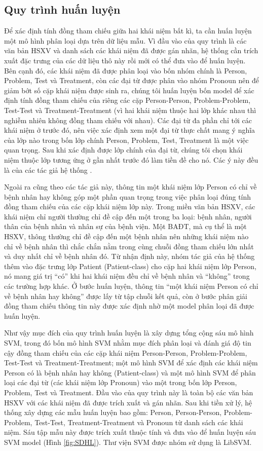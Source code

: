 \subsection*{Quy trình huấn luyện}
Để xác định tính đồng tham chiếu giữa hai khái niệm bất kì, ta cần huấn luyện một mô hình phân loại dựa trên dữ liệu mẫu. Vì đầu vào của quy trình là các văn bản HSXV và danh sách các khái niệm đã được gán nhãn, hệ thống cần trích xuất đặc trưng của các dữ liệu thô này rồi mới có thể đưa vào để huấn luyện. Bên cạnh đó, các khái niệm đã được phân loại vào bốn nhóm chính là Person, Problem, Test và Treatment, còn các đại từ được phân vào nhóm Pronoun nên để giảm bớt số cặp khái niệm được sinh ra, chúng tôi huấn luyện bốn model để xác định tính đồng tham chiếu của riêng các cặp Person-Person, Problem-Problem, Test-Test và Treatment-Treatment (vì hai khái niệm thuộc hai lớp khác nhau thì nghiễm nhiên không đồng tham chiếu với nhau). Các đại từ đa phần chỉ tới các khái niệm ở trước đó, nên việc xác định xem một đại từ thực chất mang ý nghĩa của lớp nào trong bốn lớp chính Person, Problem, Test, Treatment là một việc quan trọng. Sau khi xác định được lớp chính của đại từ, chúng tôi chọn khái niệm thuộc lớp tương ứng ở gần nhất trước đó làm tiền đề cho nó. Các ý này đều là của các tác giả hệ thống \cite{YanXu2012}.

Ngoài ra cũng theo các tác giả này, thông tin một khái niệm lớp Person có chỉ về bệnh nhân hay không góp một phần quan trọng trong việc phân loại đúng tính đồng tham chiếu của các cặp khái niệm lớp này. Trong miền văn bản HSXV, các khái niệm chỉ người thường chỉ đề cập đến một trong ba loại: bệnh nhân, người thân của bệnh nhân và nhân sự của bệnh viện. Một BAĐT, mà cụ thể là một HSXV, thông thường chỉ đề cập đến một bệnh nhân nên những khái niệm nào chỉ về bệnh nhân thì chắc chắn nằm trong cùng chuỗi đồng tham chiếu lớn nhất và duy nhất chỉ về bệnh nhân đó. Từ nhận định này, nhóm tác giả của hệ thống \cite{YanXu2012} thêm vào đặc trưng lớp Patient (Patient-class) cho cặp hai khái niệm lớp Person, nó mang giá trị ``có'' khi hai khái niệm đều chỉ về bệnh nhân và ``không'' trong các trường hợp khác. Ở bước huấn luyện, thông tin ``một khái niệm Person có chỉ về bệnh nhân hay không'' được lấy từ tập chuỗi kết quả, còn ở bước phân giải đồng tham chiếu thông tin này được xác định nhờ một model phân loại đã được huấn luyện.

Như vậy mục đích của quy trình huấn luyện là xây dựng tổng cộng sáu mô hình SVM, trong đó bốn mô hình SVM nhằm mục đích phân loại và đánh giá độ tin cậy đồng tham chiếu của các cặp khái niệm Person-Person, Problem-Problem, Test-Test và Treatment-Treatment; một mô hình SVM để xác định các khái niệm Person có là bệnh nhân hay không (Patient-class) và một mô hình SVM để phân loại các đại từ (các khái niệm lớp Pronoun) vào một trong bốn lớp Person, Problem, Test và Treatment. Đầu vào của quy trình này là toàn bộ các văn bản HSXV với các khái niệm đã được trích xuất và gán nhãn. Sau khi tiền xử lý, hệ thống xây dựng các mẫu huấn luyện bao gồm: Person, Person-Person, Problem-Problem, Test-Test, Treatment-Treatment và Pronoun từ danh sách các khái niệm. Sáu tập mẫu này được trích xuất thuộc tính và đưa vào để huấn luyện sáu SVM model (Hình \ref{fig:SDHL}). Thư viện SVM được nhóm sử dụng là LibSVM. 

